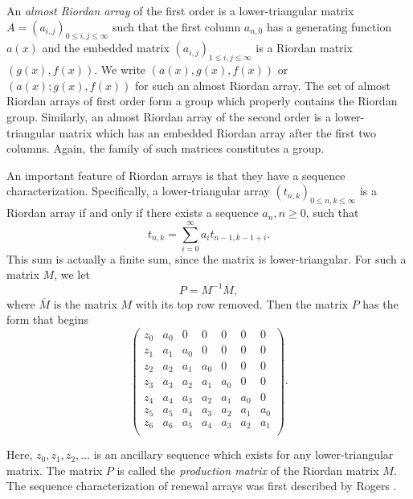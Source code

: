 \documentclass[12pt,reqno]{article}
\theoremstyle{definition}
\begin{document}
An \emph{almost Riordan array} of the first order is a lower-triangular matrix $A=\left(a_{i,j}\right)_{0 \le i,j \le \infty}$ such that the first column $a_{n,0}$ has a generating function $a(x)$ and the embedded matrix $\left(a_{i,j}\right)_{1 \le i,j \le \infty}$ is a Riordan matrix $(g(x), f(x))$. We write $(a(x), g(x), f(x))$ or $(a(x); g(x), f(x))$ for such an almost Riordan array. The set of almost Riordan arrays of first order form a group which properly contains the Riordan group. Similarly, an almost Riordan array of the second order is a lower-triangular matrix which has an embedded Riordan array after the first two columns. Again, the family of such matrices constitutes a group.

An important feature of Riordan arrays \cite{book, book2, Survey, SGWW} is that they have a sequence characterization. Specifically, a lower-triangular array $(t_{n,k})_{0 \le n,k \le \infty}$ is a Riordan array if and only if there exists a sequence $a_n, n\ge 0$, such that
$$t_{n,k}=\sum_{i=0}^{\infty}a_i t_{n-1,k-1+i}.$$
This sum is actually a finite sum, since the matrix is lower-triangular. For such a matrix $M$, we let  $$P=M^{-1}\overline{M},$$ where $\overline{M}$ is the matrix $M$ with its top row removed. Then the matrix $P$ has the form that begins
$$\left(
\begin{array}{ccccccc}
 z_0 & a_0 & 0 & 0 & 0 & 0 & 0 \\
 z_1 & a_1 & a_0 & 0 & 0 & 0 & 0 \\
 z_2 & a_2 & a_1 & a_0 & 0 & 0 & 0 \\
 z_3 & a_3 & a_2 & a_1 & a_0 & 0 & 0 \\
 z_4 & a_4 & a_3 & a_2 & a_1 & a_0 & 0 \\
 z_5 & a_5 & a_4 & a_3 & a_2 & a_1 & a_0 \\
 z_6 & a_6 & a_5 & a_4 & a_3 & a_2 & a_1 \\
\end{array}
\right).$$

Here, $z_0,z_1,z_2,\ldots$ is an ancillary sequence which exists for any lower-triangular matrix. The matrix $P$ is called the \emph{production matrix} of the Riordan matrix $M$. The sequence characterization of renewal arrays was first described by Rogers \cite{He_A, Rogers}.
\end{document}
